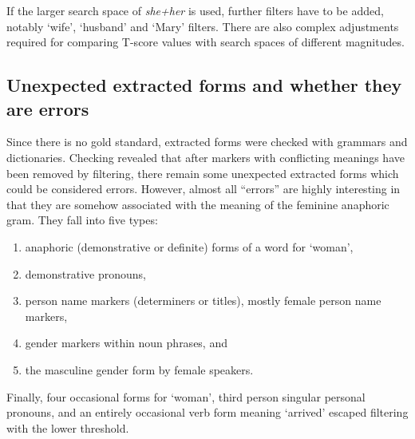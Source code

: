 \documentclass[output=collectionpaper]{langsci/langscibook}
\begin{document}
If the larger search space of  \textit{she+her} is used, further filters have to be added, notably ‘wife’, ‘husband’ and ‘Mary’ filters. There are also complex adjustments required for comparing T-score values with search spaces of different magnitudes.


\subsection{Unexpected extracted forms and whether they are errors}
\label{sec:BW:3.4}

Since there is no gold standard, extracted forms were checked with grammars and dictionaries. Checking revealed that after markers with conflicting meanings have been removed by filtering, there remain some unexpected extracted forms which could be considered errors. However, almost all “errors” are highly interesting in that they are somehow associated with the meaning of the feminine anaphoric gram. They fall into five types:

\begin{enumerate}[label=(\alph*)]
\item anaphoric (demonstrative or definite) forms of a word for ‘woman’,
\item demonstrative pronouns,
\item person name markers (determiners or titles), mostly female person name markers,
\item gender markers within noun phrases, and
\item the masculine gender form by female speakers.
\end{enumerate}

Finally, four occasional forms for ‘woman’, third person singular personal pronouns, and an entirely occasional verb form meaning ‘arrived’ escaped filtering with the lower threshold.
\end{document}
